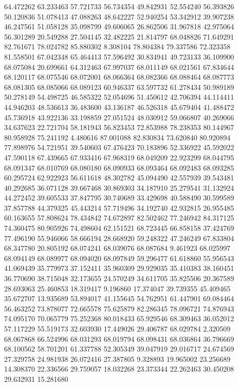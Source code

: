 64.472262
63.233463
57.721733
56.734354
49.842931
52.554240
56.393826
50.120836
51.078413
47.088263
48.642227
52.940254
53.342912
39.907238
46.247561
51.058128
35.098799
49.606065
26.862506
31.967818
42.975064
56.301289
20.549288
27.504145
32.482225
21.814797
68.048826
71.649291
82.761671
78.024782
85.880302
8.308104
78.804384
79.337586
72.323358
81.558501
67.042348
65.464413
57.596492
30.834941
49.723133
36.109900
68.075084
20.699661
64.312463
67.997037
68.011149
68.021561
67.834644
68.120117
68.075546
68.072001
68.066364
68.082366
68.088464
68.087773
68.081305
68.085066
68.089123
60.946337
63.597732
61.278434
50.989189
50.278149
54.498725
46.585322
52.054696
51.450612
42.706394
44.114411
44.946203
48.536613
36.483600
43.136187
46.526318
45.679404
41.488472
45.736918
43.922136
33.198859
27.051524
48.030912
59.066807
40.269066
34.637623
22.721704
58.181943
56.823453
72.853988
78.238353
80.144967
80.958928
75.241192
4.480616
87.001088
82.830834
73.620840
80.920894
77.898976
54.721951
39.540603
67.476423
70.183896
52.336922
45.592022
47.590118
67.439665
67.933416
67.968319
68.049209
22.923299
68.044795
68.091347
68.010769
68.080180
68.090933
68.093464
68.092483
68.093285
60.295724
62.922923
56.611618
48.302782
45.094490
42.557939
39.543481
40.292685
36.071128
39.667468
30.869303
34.187910
25.279541
31.132924
44.272452
39.605533
37.847795
30.740689
33.429698
40.588490
30.599589
37.857788
44.379325
45.443214
57.719496
34.192740
42.932815
26.955485
60.163655
57.808624
78.434842
74.672897
82.502462
77.246942
84.317125
74.360475
80.905926
74.498604
62.151521
68.723445
66.858158
37.424769
77.496190
55.946066
58.666194
28.668920
59.248322
47.246249
67.833804
68.347780
20.805192
68.074241
68.039076
68.087684
9.461923
68.025997
68.094149
68.089977
68.094020
68.097849
59.296477
61.618860
55.956543
41.069439
35.779973
37.152411
35.960309
29.929035
35.410383
38.160451
36.770690
38.715048
32.173655
24.570249
34.611705
35.825506
20.367589
28.693063
25.460853
18.319417
9.196860
17.374047
39.739355
45.409465
35.672707
13.935689
53.894017
41.155645
54.762951
61.447901
69.084464
56.463252
73.878077
72.665578
75.625879
82.286345
78.096721
74.876943
74.095170
70.065779
75.252368
80.018433
65.929546
68.309463
36.052012
57.117229
55.519173
32.603930
17.449026
29.406787
68.029784
2.320509
68.067868
66.524996
68.031293
68.019794
68.098431
68.036864
36.796669
68.100562
58.701201
61.337788
52.305349
39.047919
29.016717
24.674569
27.329758
24.981938
26.072416
27.387805
9.328893
19.965002
23.256689
14.308370
22.336566
29.759057
18.032268
23.373344
22.262463
30.450208
29.632931
15.281680
